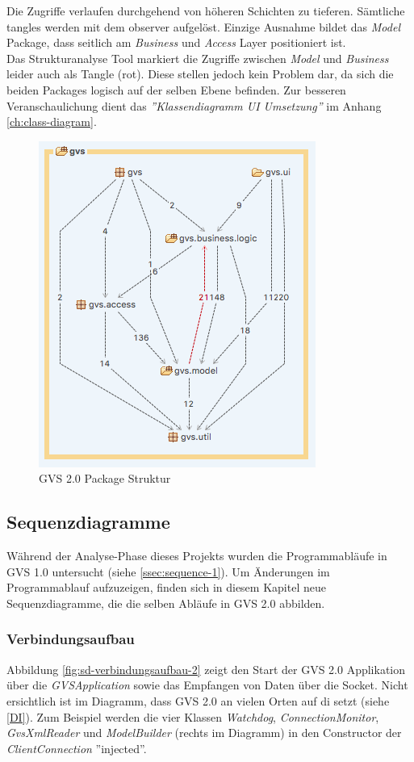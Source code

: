 \documentclass[11pt,a4paper,english,oneside]{book}
\numberwithin{equation}{chapter}
\begin{document}
	\noindent
	Die Zugriffe verlaufen durchgehend von höheren Schichten zu tieferen. Sämtliche \glspl{tangle} werden mit dem \gls{observer} aufgelöst. Einzige Ausnahme bildet das \textit{Model} Package, dass seitlich am \textit{Business} und \textit{Access} Layer positioniert ist. \\
	\noindent
	Das Strukturanalyse Tool markiert die Zugriffe zwischen \textit{Model} und \textit{Business} leider auch als Tangle (rot). Diese stellen jedoch kein Problem dar, da sich die beiden Packages logisch auf der selben Ebene befinden. Zur besseren Veranschaulichung dient das \textit{''Klassendiagramm UI Umsetzung''} im Anhang \ref{ch:class-diagram}.
	
	\begin{figure}[h!]
		\centering
		\includegraphics[width=0.4\linewidth]{assets/images/structure-gvs2}
		\caption{GVS 2.0 Package Struktur}
		\label{fig:structure-gvs2}
	\end{figure}
	
	
	\subsection{Sequenzdiagramme}
	Während der Analyse-Phase dieses Projekts wurden die Programmabläufe in GVS 1.0 untersucht (siehe \ref{ssec:sequence-1}). Um Änderungen im Programmablauf aufzuzeigen, finden sich in diesem Kapitel neue Sequenzdiagramme, die die selben Abläufe in GVS 2.0 abbilden. 
	
	\subsubsection{Verbindungsaufbau}
	Abbildung \ref{fig:sd-verbindungsaufbau-2} zeigt den Start der GVS 2.0 Applikation über die \textit{GVSApplication} sowie das Empfangen von Daten über die Socket. Nicht ersichtlich ist im Diagramm, dass GVS 2.0 an vielen Orten auf \gls{di} setzt (siehe \ref{DI}). Zum Beispiel werden die vier Klassen \textit{Watchdog},  \textit{ConnectionMonitor},  \textit{GvsXmlReader} und  \textit{ModelBuilder} (rechts im Diagramm) in den Constructor der  \textit{ClientConnection} ''injected''.
	
\end{document}
